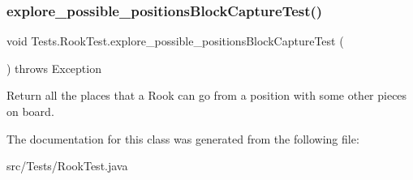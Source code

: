 \subsubsection{\texorpdfstring{explore\+\_\+possible\+\_\+positions\+Block\+Capture\+Test()}{explore\_possible\_positionsBlockCaptureTest()}}
{\footnotesize\ttfamily void Tests.\+Rook\+Test.\+explore\+\_\+possible\+\_\+positions\+Block\+Capture\+Test (\begin{DoxyParamCaption}{ }\end{DoxyParamCaption}) throws Exception\hspace{0.3cm}{\ttfamily [inline]}}

Return all the places that a Rook can go from a position with some other pieces on board. 

The documentation for this class was generated from the following file\+:\begin{DoxyCompactItemize}
\item 
src/\+Tests/Rook\+Test.\+java\end{DoxyCompactItemize}
